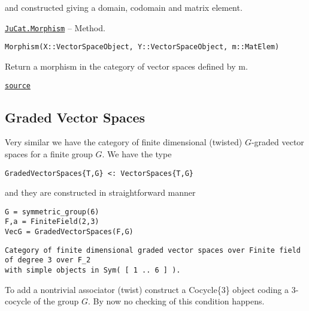 \documentclass{memoir}
\begin{document}
and constructed giving a domain, codomain and matrix element.


\hypertarget{16637970097491642119}{} 
\hyperlink{16637970097491642119}{\texttt{JuCat.Morphism}}  -- {Method.}

\begin{adjustwidth}{2em}{0pt}


\begin{verbatim}
Morphism(X::VectorSpaceObject, Y::VectorSpaceObject, m::MatElem)
\end{verbatim}

Return a morphism in the category of vector spaces defined by m.



\href{https://github.com/FabianMaeurer/JuCat.jl/blob/367390e2d003deec2ababa73caeab405e934bb35/src/structures/VectorSpaces/VectorSpaces.jl#L66-L70}{\texttt{source}}


\end{adjustwidth}

\hypertarget{1363918412184924542}{}


\subsection{Graded Vector Spaces}



Very similar we have the category of finite dimensional (twisted) \(G\)-graded vector spaces for a finite group \(G\). We have the type




\begin{lstlisting}
GradedVectorSpaces{T,G} <: VectorSpaces{T,G}
\end{lstlisting}



and they are constructed in straightforward manner




\begin{verbatim}
G = symmetric_group(6)
F,a = FiniteField(2,3)
VecG = GradedVectorSpaces(F,G)
\end{verbatim}


\begin{lstlisting}
Category of finite dimensional graded vector spaces over Finite field of degree 3 over F_2
with simple objects in Sym( [ 1 .. 6 ] ).
\end{lstlisting}



To add a nontrivial associator (twist) construct a Cocycle\{3\} object coding a 3-cocycle of the group \(G\). By now no checking of this condition happens.
\end{document}
